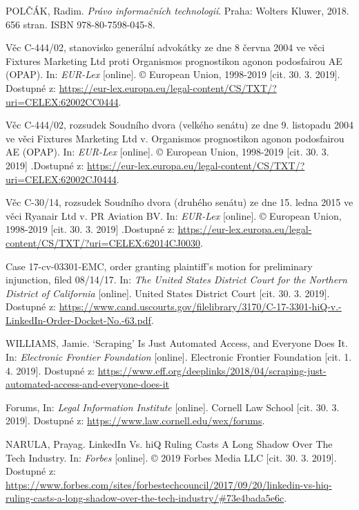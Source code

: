 \documentclass[thesis=B,czech]{FITthesis}[2012/06/26]
\begin{document}
\begin{thebibliography}{99}
	POLČÁK, Radim. \textit{Právo informačních technologií}. Praha: Wolters Kluwer, 2018. 656 stran. ISBN 978-80-7598-045-8.
	
	Věc C-444/02, stanovisko generální advokátky ze dne 8 června 2004 ve věci Fixtures Marketing Ltd proti Organismos prognostikon agonon podosfairou AE (OPAP). In: \textit{EUR-Lex} [online]. © European Union, 1998-2019 [cit. 30. 3. 2019]. Dostupné z: \url{https://eur-lex.europa.eu/legal-content/CS/TXT/?uri=CELEX:62002CC0444}.
	
	Věc C-444/02, rozsudek Soudního dvora (velkého senátu) ze dne 9. listopadu 2004 ve věci Fixtures Marketing Ltd v. Organismos prognostikon agonon podosfairou AE (OPAP). In: \textit{EUR-Lex} [online]. © European Union, 1998-2019 [cit. 30. 3. 2019] .Dostupné z: \url{https://eur-lex.europa.eu/legal-content/CS/TXT/?uri=CELEX:62002CJ0444}.
	
	Věc C-30/14, rozsudek Soudního dvora (druhého senátu) ze dne 15. ledna 2015 ve věci Ryanair Ltd v. PR Aviation BV. In: \textit{EUR-Lex} [online]. © European Union, 1998-2019 [cit. 30. 3. 2019] .Dostupné z: \url{https://eur-lex.europa.eu/legal-content/CS/TXT/?uri=CELEX:62014CJ0030}.
	
	Case 17-cv-03301-EMC, order granting plaintiff's motion for preliminary injunction, filed 08/14/17. In: \textit{The United States District Court for the Northern District of California} [online]. United States District Court [cit. 30. 3. 2019]. Dostupné z: \url{https://www.cand.uscourts.gov/filelibrary/3170/C-17-3301-hiQ-v.-LinkedIn-Order-Docket-No.-63.pdf}.
	
	WILLIAMS, Jamie. ‘Scraping’ Is Just Automated Access, and Everyone Does It. In: \textit{Electronic Frontier Foundation} [online]. Electronic Frontier Foundation [cit. 1. 4. 2019]. Dostupné z: \url{https://www.eff.org/deeplinks/2018/04/scraping-just-automated-access-and-everyone-does-it}
	
	Forums, In: \textit{Legal Information Institute} [online]. Cornell Law School [cit. 30. 3. 2019]. Dostupné z: \url{https://www.law.cornell.edu/wex/forums}.
	
	NARULA, Prayag. LinkedIn Vs. hiQ Ruling Casts A Long Shadow Over The Tech Industry. In: \textit{Forbes} [online]. © 2019 Forbes Media LLC [cit. 30. 3. 2019]. Dostupné z: \url{https://www.forbes.com/sites/forbestechcouncil/2017/09/20/linkedin-vs-hiq-ruling-casts-a-long-shadow-over-the-tech-industry/#73e4bada5e6c}.
	

\end{thebibliography}
\end{document}
